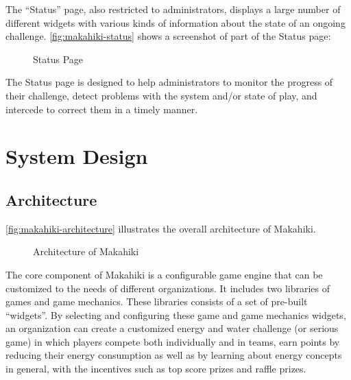 The ``Status'' page, also restricted to administrators, displays a large number of different widgets with various kinds of information about the state of an ongoing challenge. \autoref{fig:makahiki-status} shows a screenshot of part of the Status page:

\begin{figure}[!ht]
\begin{center}
\end{center}
\caption{Status Page}
\label{fig:makahiki-status}
\end{figure}

The Status page is designed to help administrators to monitor the progress of their challenge, detect problems with the system and/or state of play, and intercede to correct them in a timely manner.

\clearpage

\section{System Design}
\label{sec:makahiki-design}

\subsection{Architecture}

\autoref{fig:makahiki-architecture} illustrates the overall architecture of Makahiki.

\begin{figure}[!ht]
\begin{center}
\end{center}
\caption{Architecture of Makahiki}
\label{fig:makahiki-architecture}
\end{figure}

The core component of Makahiki is a configurable game engine that can be customized to the needs of different organizations.  It includes two libraries of games and game mechanics. These libraries consists of a set of pre-built ``widgets''. By selecting and configuring these game and game mechanics widgets, an organization can create a customized energy and water challenge (or serious game) in which players compete both individually and in teams, earn points by reducing their energy consumption as well as by learning about energy concepts in general, with the incentives such as top score prizes and raffle prizes.  

